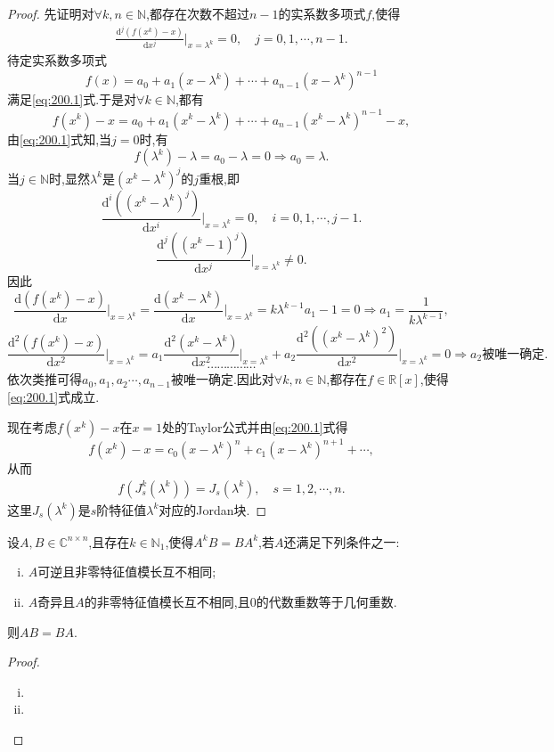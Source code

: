 \documentclass[../../main.tex]{subfiles}%
\begin{document}
\begin{proof}

先证明对$\forall k,n\in \mathbb{N}$,都存在次数不超过$n-1$的实系数多项式$f$,使得
\begin{align}
\frac{\mathrm{d}^j\left( f\left( x^k \right) -x \right)}{\mathrm{d}x^j}\bigg|_{x=\lambda^k}=0,\quad j=0,1,\cdots ,n-1.
\label{eq:200.1}
\end{align}
待定实系数多项式
\[
f(x) =a_0+a_1(x-\lambda^k) +\cdots +a_{n-1}(x-\lambda^k) ^{n-1}
\]
满足\eqref{eq:200.1}式.于是对$\forall k\in \mathbb{N}$,都有
\[
f(x^k) -x=a_0+a_1(x^k-\lambda^k) +\cdots +a_{n-1}(x^k-\lambda^k) ^{n-1}-x,
\]
由\eqref{eq:200.1}式知,当$j=0$时,有
\[
f(\lambda^k) -\lambda=a_0-\lambda=0\Longrightarrow a_0=\lambda.
\]
当$j\in \mathbb{N}$时,显然$\lambda^k$是$(x^k-\lambda^k)^j$的$j$重根,即
\[
\frac{\mathrm{d}^i\left( (x^k-\lambda^k)^j \right)}{\mathrm{d}x^i}\bigg|_{x=\lambda^k}=0,\quad i=0,1,\cdots ,j-1.
\]
\[
\frac{\mathrm{d}^j\left( (x^k-1)^j \right)}{\mathrm{d}x^j}\bigg|_{x=\lambda^k}\ne 0.
\]
因此
\[
\frac{\mathrm{d}\left( f(x^k) -x \right)}{\mathrm{d}x}\bigg|_{x=\lambda^k}=\frac{\mathrm{d}\left( x^k-\lambda ^k \right)}{\mathrm{d}x}\bigg|_{x=\lambda^k}=k\lambda ^{k-1}a_1-1=0\Longrightarrow a_1=\frac{1}{k\lambda ^{k-1}},
\]
\[
\frac{\mathrm{d}^2\left( f(x^k) -x \right)}{\mathrm{d}x^2}\bigg|_{x=\lambda^k}= a_1\frac{\mathrm{d}^2\left( x^k-\lambda^k \right)}{\mathrm{d}x^2}\bigg|_{x=\lambda^k}+a_2\frac{\mathrm{d}^2\left( (x^k-\lambda^k)^2 \right)}{\mathrm{d}x^2}\bigg|_{x=\lambda^k}=0\Longrightarrow a_2\text{被唯一确定}.
\]
\[
\cdots \cdots \cdots \cdots \cdots
\]
依次类推可得$a_0,a_1,a_2\cdots ,a_{n-1}$被唯一确定.因此对$\forall k,n\in \mathbb{N}$,都存在$f\in \mathbb{R}[x]$,使得\eqref{eq:200.1}式成立.

现在考虑$f(x^k) -x$在$x=1$处的Taylor公式并由\eqref{eq:200.1}式得
\[
f(x^k) -x=c_0(x-\lambda^k)^n+c_1(x-\lambda^k)^{n+1}+\cdots,
\]
从而
\begin{align*}
f\left( J_{s}^{k}(\lambda^k) \right) =J_s(\lambda^k),\quad s=1,2,\cdots ,n.
\end{align*}
这里$J_s(\lambda^k)$是$s$阶特征值$\lambda^k$对应的Jordan块.

\end{proof}

\begin{corollary}
设$A,B\in \mathbb{C} ^{n\times n}$,且存在$k\in \mathbb{N} _1$,使得$A^kB=BA^k$,若$A$还满足下列条件之一:
\begin{enumerate}[(i)]
\item $A$可逆且非零特征值模长互不相同;

\item $A$奇异且$A$的非零特征值模长互不相同,且0的代数重数等于几何重数.
\end{enumerate}
则$AB=BA.$
\end{corollary}
\begin{proof}
\begin{enumerate}[(i)]
\item 

\item 
\end{enumerate}
\end{proof}
\end{document}
